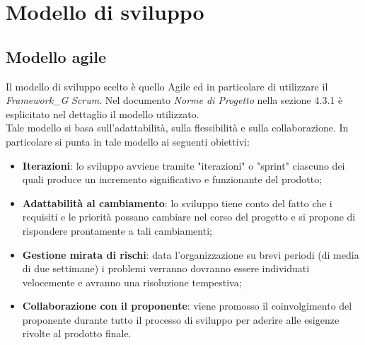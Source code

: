 \section{Modello di sviluppo}
\subsection{Modello agile}
Il modello di sviluppo scelto è quello Agile ed in particolare di utilizzare il \textit{Framework_G} \emph{Scrum}. Nel documento \emph{Norme di Progetto} nella sezione 4.3.1 è esplicitato nel dettaglio il modello utilizzato.\\ 
Tale modello si basa sull'adattabilità, sulla flessibilità e sulla collaborazione.
In particolare si punta in tale modello ai seguenti obiettivi:
\begin{itemize}
    \item \textbf{Iterazioni}: lo sviluppo avviene tramite "iterazioni" o "sprint" ciascuno dei quali produce un incremento significativo e funzionante del prodotto;
    \item \textbf{Adattabilità al cambiamento}: lo sviluppo tiene conto del fatto che i requisiti e le priorità possano cambiare nel corso del progetto e si propone di rispondere prontamente a tali cambiamenti;
    \item \textbf{Gestione mirata di rischi}: data l'organizzazione su brevi periodi (di media di due settimane) i problemi verranno dovranno essere individuati velocemente e avranno una risoluzione tempestiva;
    \item \textbf{Collaborazione con il proponente}: viene promosso il coinvolgimento del proponente durante tutto il processo di sviluppo per aderire alle esigenze rivolte al prodotto finale.
\end{itemize}